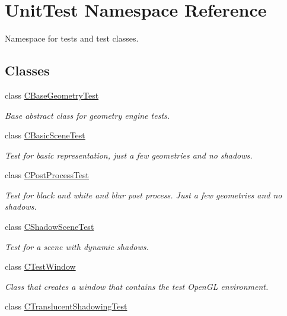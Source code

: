\hypertarget{namespace_unit_test}{}\section{Unit\+Test Namespace Reference}
\label{namespace_unit_test}


Namespace for tests and test classes.  


\subsection*{Classes}
\begin{DoxyCompactItemize}
\item 
class \mbox{\hyperlink{class_unit_test_1_1_c_base_geometry_test}{C\+Base\+Geometry\+Test}}
\begin{DoxyCompactList}\small\item\em Base abstract class for geometry engine tests. \end{DoxyCompactList}\item 
class \mbox{\hyperlink{class_unit_test_1_1_c_basic_scene_test}{C\+Basic\+Scene\+Test}}
\begin{DoxyCompactList}\small\item\em Test for basic representation, just a few geometries and no shadows. \end{DoxyCompactList}\item 
class \mbox{\hyperlink{class_unit_test_1_1_c_post_process_test}{C\+Post\+Process\+Test}}
\begin{DoxyCompactList}\small\item\em Test for black and white and blur post process. Just a few geometries and no shadows. \end{DoxyCompactList}\item 
class \mbox{\hyperlink{class_unit_test_1_1_c_shadow_scene_test}{C\+Shadow\+Scene\+Test}}
\begin{DoxyCompactList}\small\item\em Test for a scene with dynamic shadows. \end{DoxyCompactList}\item 
class \mbox{\hyperlink{class_unit_test_1_1_c_test_window}{C\+Test\+Window}}
\begin{DoxyCompactList}\small\item\em Class that creates a window that contains the test Open\+GL environment. \end{DoxyCompactList}\item 
class \mbox{\hyperlink{class_unit_test_1_1_c_translucent_shadowing_test}{C\+Translucent\+Shadowing\+Test}}

\end{DoxyCompactItemize}
